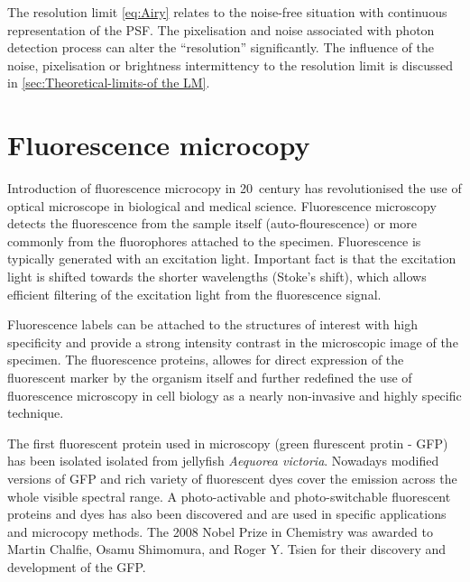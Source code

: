 The resolution limit \autoref{eq:Airy} relates to the noise-free situation with continuous representation of the PSF. The pixelisation and noise associated with photon detection process can alter the ``resolution'' significantly. The influence of the noise, pixelisation or brightness intermittency to the resolution limit is discussed in \autoref{sec:Theoretical-limits-of the LM}. 




\section{Fluorescence microcopy\label{sec:Fluorescence microcopy}}

Introduction of fluorescence microcopy in 20\ths\ century has revolutionised the use of optical microscope in biological and medical science. Fluorescence microscopy detects the fluorescence from the sample itself (auto-flourescence) or more commonly from the fluorophores attached to the specimen. Fluorescence is typically generated with an excitation light. Important fact is that the excitation light is shifted towards the shorter wavelengths (Stoke's shift),  which allows efficient filtering of the excitation light from the fluorescence signal. 

Fluorescence labels can be attached to the structures of interest with high specificity and provide a strong intensity contrast in the microscopic image of the specimen. The fluorescence proteins, allowes for direct expression of the fluorescent marker by the organism itself and further redefined the use of fluorescence microscopy in cell biology as a nearly non-invasive and highly specific technique. 

 The first fluorescent protein used in microscopy (green flurescent protin - GFP) has been isolated isolated from jellyfish {\it Aequorea victoria}. Nowadays modified versions of GFP and rich variety of fluorescent dyes cover the emission across the whole visible spectral range. A photo-activable and photo-switchable fluorescent proteins and dyes has also been discovered and are used in specific applications and microcopy methods. The 2008 Nobel Prize in Chemistry was awarded to Martin Chalfie, Osamu Shimomura, and Roger Y. Tsien for their discovery and development of the GFP.
 
 

